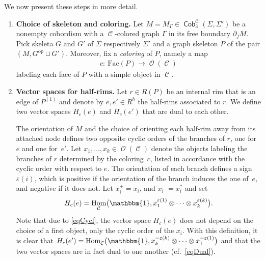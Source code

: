 \documentclass[10pt,a4paper]{amsart}
\DeclareMathOperator{\Hom}{Hom}
\DeclareMathOperator{\Cob}{\mathsf{Cob}}
\DeclareMathOperator{\calc}{\mathcal{C}}
\DeclareMathOperator{\calo}{\mathcal{O}}
\numberwithin{equation}{section}
\theoremstyle{definition}
\begin{document}
We now present these steps in more detail.
\begin{enumerate}\itemsep=0pt
 \item \textbf{Choice of skeleton and coloring.}
 Let $M = M_{\Gamma} \in \Cob_3^{\calc}(\Sigma, \Sigma')$ be a nonempty cobordism with a $\calc$-colored graph $\Gamma$ in its free boundary $\partial_fM$. Pick skeleta $G$ and $G'$ of $\Sigma$ respectively $\Sigma'$ and a graph skeleton $P$ of the pair $(M, G^{\mathrm{op}} \sqcup G')$. Moreover, fix a \textit{coloring} of $P$, namely a map
 \begin{align*}
 c\colon \ \mathrm{Fac}(P) \rightarrow \calo(\calc)
 \end{align*}
 labeling each face of $P$ with a simple object in $\calc$.
 \item \label{itemTVCon2} \textbf{Vector spaces for half-rims.} Let $r \in R(P)$ be an internal rim that is an edge of $P^{(1)}$ and denote by $e, e' \in R^h$ the half-rims associated to $r$. We define two vector spaces $H_c(e)$ and $H_c(e')$ that are dual to each other.

 The orientation of $M$ and the choice of orienting each half-rim away from its attached node defines two opposite cyclic orders of the branches of $r$, one for $e$ and one for~$e'$. Let $x_1, \dots, x_k \in \calo({\calc})$ denote the objects labeling the branches of $r$ determined by the coloring~$c$, listed in accordance with the cyclic order with respect to $e$. The orientation of each branch defines a sign $\varepsilon(i)$, which is positive if the orientation of the branch induces the one of~$e$, and negative if it does not. Let $x_i^+ = x_i$, and $x_i^- = x_i^{*}$ and set
 \begin{align*}
 H_c(e) = \Hom_{\calc}\bigl(\mathbbm{1}, x_1^{\varepsilon(1)} \otimes \dots \otimes x_k^{\varepsilon(k)}\bigr).
 \end{align*}
 Note that due to \eqref{eqCycl}, the vector space $H_c(e)$ does not depend on the choice of a first object, only the cyclic order of the $x_i$. With this definition, it is clear that $H_c(e') = \Hom_{\calc}\bigl(\mathbbm{1}, x_k^{-\varepsilon(k)} \otimes \dots \otimes x_1^{-\varepsilon(1)}\bigr)$ and that the two vector spaces are in fact dual to one another (cf.~\eqref{eqDual}).


\end{enumerate}
\end{document}
